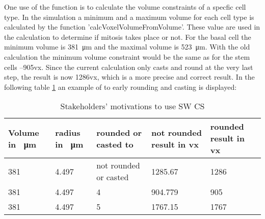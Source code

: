 One use of the function is to calculate the volume constraints of a specfic cell type. In the simulation a minimum and a maximum volume for each cell type is calculated by the function 'calcVoxelVolumeFromVolume'. These value are used in the calculation to determine if mitosis takes place or not. \newline
For the basal cell the minimum volume is \SI{381}{\micro\metre} and the maximal volume is \SI{523}{\micro\metre}. With the old calculation the minimum volume constraint would be the same as for the stem cells --905vx. Since the current calculation only casts and round at the very last step, the result is now 1286vx, which is a more precise and correct result. In the following table \ref{tbl:Approximation error} an example of to early rounding and casting is displayed:

\begin{table}[h]
\centering
\caption{Stakeholders' motivations to use \ac{SW CS}}
\renewcommand{\arraystretch}{1.5}
	\begin{tabularx}{\textwidth}{XXXXX}
		Volume in \SI{}{\micro\metre} & radius in \SI{}{\micro\metre} & rounded or casted to & not rounded result in vx & rounded result in vx  \\
		\hline
		381 & 4.497 & not rounded or casted &1285.67 & 1286 \\
		
		381 & 4.497 & 4 & 904.779 & 905\\
		
		381 & 4.497 & 5 & 1767.15 & 1767\\

	\end{tabularx}
	\label{tbl:Approximation error}
\end{table}

